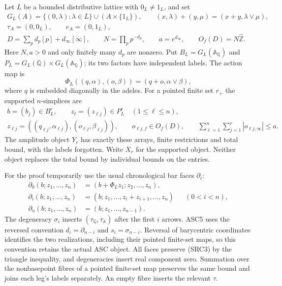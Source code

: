 Let $L$ be a bounded distributive lattice with $0_L\ne1_L$, and set
\begin{equation}\tag{SRC1}
\begin{gathered}
G_L(A)=\{(0,\lambda):\lambda\in L\}\cup(A\times\{1_L\}),\qquad
(x,\lambda)+(y,\mu)=(x+y,\lambda\vee\mu),\\
\tau_A=(0,0_L),\qquad e_A=(0,1_L),\\
D=\sum_p d_p[p]+d_\infty[\infty],\qquad
N=\prod_p p^{-d_p},\qquad a=e^{d_\infty},\qquad
O_f(D)=N\widehat{\mathbb Z}.
\end{gathered}
\end{equation}
Here $N,a>0$ and only finitely many $d_p$ are nonzero. Put
$B_L=G_L(\mathbb A_{\mathbb Q})$ and
$P_L=G_L(\mathbb Q)\times G_L(\mathbb A_{\mathbb Q})$; its two
factors have independent labels. The action map is
\begin{equation}\tag{SRC2}
\Phi_L((q,\alpha),(o,\beta))=(q+o,\alpha\vee\beta),
\end{equation}
where $q$ is embedded diagonally in the adeles.
For a pointed finite set $r_+$ the supported $n$-simplices are
\begin{equation}\tag{SRC3}
\begin{gathered}
b=(b_j)\in B_L^r,\qquad
z_\ell=(z_{\ell j})\in P_L^r\quad(1\le\ell\le n),\\
z_{\ell j}=((q_{\ell j},\alpha_{\ell j}),
             (o_{\ell j},\beta_{\ell j})),\qquad
o_{\ell j,f}\in O_f(D),\qquad
\sum_{\ell=1}^n\sum_{j=1}^r|o_{\ell j,\infty}|\le a.
\end{gathered}
\end{equation}
The amplitude object $Y_r$ has exactly these arrays, finite
restrictions and total bound, with the labels forgotten. Write $X_r$
for the supported object. Neither object replaces the total bound
by individual bounds on the entries.

For the proof temporarily use the usual chronological bar faces
$\partial_i$:
\begin{equation}\tag{SRC4}
\begin{aligned}
\partial_0(b;z_1,\ldots,z_n)
  &=(b+\Phi_Lz_1;z_2,\ldots,z_n),\\
\partial_i(b;z_1,\ldots,z_n)
  &=(b;z_1,\ldots,z_i+z_{i+1},\ldots,z_n)
      &&(0<i<n),\\
\partial_n(b;z_1,\ldots,z_n)&=(b;z_1,\ldots,z_{n-1}).
\end{aligned}
\end{equation}
The degeneracy $\sigma_i$ inserts $(\tau_{\mathbb Q},\tau_{\mathbb A})$
after the first $i$ arrows. ASC5 uses the reversed convention
$d_i=\partial_{n-i}$ and $s_i=\sigma_{n-i}$. Reversal of barycentric
coordinates identifies the two realizations, including their pointed
finite-set maps, so this convention retains the actual ASC object.
All faces preserve (SRC3) by the triangle inequality, and degeneracies
insert real component zero. Summation over the nonbasepoint fibres of
a pointed finite-set map preserves the same bound and joins each
leg's labels separately. An empty fibre inserts the relevant $\tau$.

